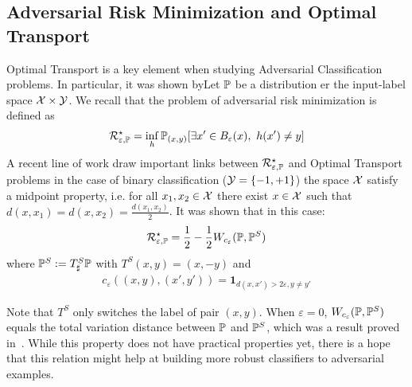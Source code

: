 
\subsection{Adversarial Risk Minimization and Optimal Transport} Optimal Transport is a key element when studying Adversarial Classification problems. In particular, it was shown byLet $\mathbb{P}$ be a distribution er the input-label space $\mathcal{X}\times\mathcal{Y}$. We recall that the problem of adversarial risk minimization is defined as
\begin{align*}
    \risk_{\varepsilon,\PP}^\star = \inf_{h} \PP_{(x,y)}\left[\exists x'\in B_\varepsilon(x),~h(x')\neq y\right]
\end{align*}
A recent line of work draw important links between   $\mathcal{R}_{\varepsilon,\mathbb{P}}^\star$ and Optimal Transport problems in the case of binary classification ($\mathcal{Y}=\{-1,+1\}$) the space $\mathcal{X}$ satisfy a midpoint property, i.e. for all $x_1,x_2\in\mathcal{X}$ there exist $x\in\mathcal{X}$ such that $d(x,x_1) = d(x,x_2) =\frac{d(x_1,x_2)}{2}$. It was shown that in this case:
\begin{align*}
\mathcal{R}_{\varepsilon,\mathbb{P}}^\star = \frac12-\frac12 W_{c_\varepsilon}(\mathbb{P},\mathbb{P}^S)
\end{align*}
where $\mathbb{P}^S := T^S_\sharp \mathbb{P}$ with $T^S(x,y) = (x,-y)$ and
\begin{align*}
    c_\varepsilon\left((x,y),(x',y')\right) = \mathbf{1}_{d(x,x')>2\varepsilon,y\neq y'}
\end{align*}

Note that $T^S$ only switches the label of pair $(x,y)$. When $\varepsilon=0$, $W_{c_\varepsilon}(\mathbb{P},\mathbb{P}^S)$ equals the total variation distance between $\mathbb{P}$ and $\mathbb{P}^S$, which was a result proved in~\citep{xxx}.
While this property does not have practical properties yet, there is a hope that this relation might help at building more robust classifiers to adversarial examples. 

